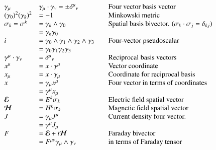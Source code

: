 \documentclass{article}
\newcommand{\EE}[0]{\boldsymbol{\mathcal{E}}}
\newcommand{\HH}[0]{\boldsymbol{\mathcal{H}}}
\begin{document}
\begin{equation*}\label{eqn:notation}
\begin{array}{l l l}
\gamma_{\mu} & \gamma_{\mu} \cdot \gamma_{\nu} = \pm {\delta^{\mu}}_{\nu} & \quad \mbox{Four vector basis vector} \\
{(\gamma_0)}^2 {(\gamma_k)}^2 &= -1 & \quad \mbox{Minkowski metric} \\
\sigma_k = \sigma^k &= \gamma_{k} \wedge \gamma_0 & \quad \mbox{Spatial basis bivector. ($\sigma_k \cdot \sigma_j = \delta_{kj}$)} \\
                    &= \gamma_{k} \gamma_0 & \\
i &= \gamma_{0} \wedge \gamma_1 \wedge \gamma_{2} \wedge \gamma_3 & \quad \mbox{Four-vector pseudoscalar} \\
  &= \gamma_{0} \gamma_1 \gamma_{2} \gamma_3 & \\
\gamma^{\mu} \cdot \gamma_{\nu} &= {\delta^{\mu}}_{\nu} & \quad \mbox{Reciprocal basis vectors} \\
x^{\mu} &= x \cdot \gamma^{\mu} & \quad \mbox{Vector coordinate} \\
x_{\mu} &= x \cdot \gamma_{\mu} & \quad \mbox{Coordinate for reciprocal basis} \\
x &= \gamma_{\mu} x^{\mu} & \quad \mbox{Four vector in terms of coordinates} \\
  &= \gamma^{\mu} x_{\mu} \\
\EE &= E^k \sigma_k & \quad \mbox{Electric field spatial vector} \\
\HH &= H^k \sigma_k & \quad \mbox{Magnetic field spatial vector} \\
J &= \gamma_{\mu} J^{\mu} & \quad \mbox{Current density four vector.} \\
  &= \gamma^{\mu} J_{\mu} \\
F &= \EE + i \HH & \quad \mbox{Faraday bivector} \\
  &= F^{\mu\nu} \gamma_\mu \wedge \gamma_\nu & \quad \mbox{in terms of Faraday tensor} \\

\end{array}
\end{equation*}
\end{document}
